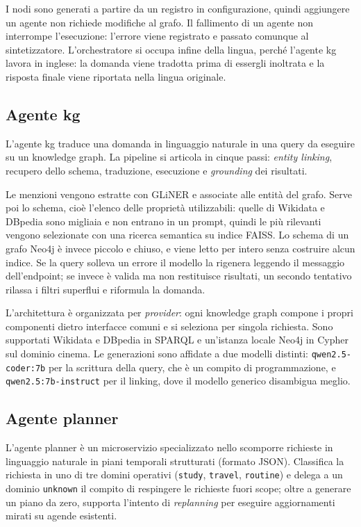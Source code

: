 \documentclass[11pt]{article}
\begin{document}
I nodi sono generati a partire da un registro in configurazione, quindi aggiungere un agente non richiede modifiche al grafo. Il fallimento di un agente non interrompe l'esecuzione: l'errore viene registrato e passato comunque al sintetizzatore. L'orchestratore si occupa infine della lingua, perché l'agente kg lavora in inglese: la domanda viene tradotta prima di essergli inoltrata e la risposta finale viene riportata nella lingua originale.

\subsection{Agente kg}

L'agente kg traduce una domanda in linguaggio naturale in una query da eseguire su un knowledge graph. La pipeline si articola in cinque passi: \textit{entity linking}, recupero dello schema, traduzione, esecuzione e \textit{grounding} dei risultati.

Le menzioni vengono estratte con GLiNER e associate alle entità del grafo. Serve poi lo schema, cioè l'elenco delle proprietà utilizzabili: quelle di Wikidata e DBpedia sono migliaia e non entrano in un prompt, quindi le più rilevanti vengono selezionate con una ricerca semantica su indice FAISS. Lo schema di un grafo Neo4j è invece piccolo e chiuso, e viene letto per intero senza costruire alcun indice. Se la query solleva un errore il modello la rigenera leggendo il messaggio dell'endpoint; se invece è valida ma non restituisce risultati, un secondo tentativo rilassa i filtri superflui e riformula la domanda.

L'architettura è organizzata per \textit{provider}: ogni knowledge graph compone i propri componenti dietro interfacce comuni e si seleziona per singola richiesta. Sono supportati Wikidata e DBpedia in SPARQL e un'istanza locale Neo4j in Cypher sul dominio cinema. Le generazioni sono affidate a due modelli distinti: \texttt{qwen2.5-coder:7b} per la scrittura della query, che è un compito di programmazione, e \texttt{qwen2.5:7b-instruct} per il linking, dove il modello generico disambigua meglio.

\subsection{Agente planner}

L'agente planner è un microservizio specializzato nello scomporre richieste in linguaggio naturale in piani temporali strutturati (formato JSON). Classifica la richiesta in uno di tre domini operativi (\texttt{study}, \texttt{travel}, \texttt{routine}) e delega a un dominio \texttt{unknown} il compito di respingere le richieste fuori scope; oltre a generare un piano da zero, supporta l'intento di \textit{replanning} per eseguire aggiornamenti mirati su agende esistenti.
\end{document}
